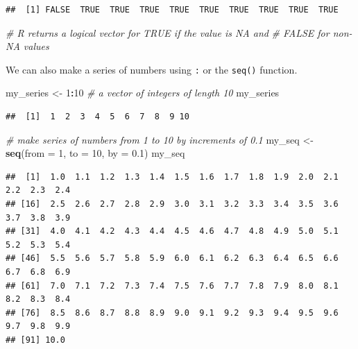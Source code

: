 \documentclass[
]{book}
\newenvironment{Shaded}{\begin{snugshade}}{\end{snugshade}}
\newcommand{\AttributeTok}[1]{\textcolor[rgb]{0.13,0.29,0.53}{#1}}
\newcommand{\CommentTok}[1]{\textcolor[rgb]{0.56,0.35,0.01}{\textit{#1}}}
\newcommand{\DecValTok}[1]{\textcolor[rgb]{0.00,0.00,0.81}{#1}}
\newcommand{\FloatTok}[1]{\textcolor[rgb]{0.00,0.00,0.81}{#1}}
\newcommand{\FunctionTok}[1]{\textcolor[rgb]{0.13,0.29,0.53}{\textbf{#1}}}
\newcommand{\NormalTok}[1]{#1}
\newcommand{\OtherTok}[1]{\textcolor[rgb]{0.56,0.35,0.01}{#1}}
\newcommand{\SpecialCharTok}[1]{\textcolor[rgb]{0.81,0.36,0.00}{\textbf{#1}}}
\begin{document}
\begin{verbatim}
##  [1] FALSE  TRUE  TRUE  TRUE  TRUE  TRUE  TRUE  TRUE  TRUE  TRUE
\end{verbatim}

\begin{Shaded}
\begin{Highlighting}[]
\CommentTok{\# R returns a logical vector for TRUE if the value is NA and }
\CommentTok{\# FALSE for non{-}NA values}
\end{Highlighting}
\end{Shaded}

We can also make a series of numbers using \texttt{:} or the \texttt{seq()} function.

\begin{Shaded}
\begin{Highlighting}[]
\NormalTok{my\_series }\OtherTok{\textless{}{-}} \DecValTok{1}\SpecialCharTok{:}\DecValTok{10} \CommentTok{\# a vector of integers of length 10}
\NormalTok{my\_series}
\end{Highlighting}
\end{Shaded}

\begin{verbatim}
##  [1]  1  2  3  4  5  6  7  8  9 10
\end{verbatim}

\begin{Shaded}
\begin{Highlighting}[]
\CommentTok{\# make series of numbers from 1 to 10 by increments of 0.1}
\NormalTok{my\_seq }\OtherTok{\textless{}{-}} \FunctionTok{seq}\NormalTok{(}\AttributeTok{from =} \DecValTok{1}\NormalTok{, }\AttributeTok{to =} \DecValTok{10}\NormalTok{, }\AttributeTok{by =} \FloatTok{0.1}\NormalTok{) }
\NormalTok{my\_seq}
\end{Highlighting}
\end{Shaded}

\begin{verbatim}
##  [1]  1.0  1.1  1.2  1.3  1.4  1.5  1.6  1.7  1.8  1.9  2.0  2.1  2.2  2.3  2.4
## [16]  2.5  2.6  2.7  2.8  2.9  3.0  3.1  3.2  3.3  3.4  3.5  3.6  3.7  3.8  3.9
## [31]  4.0  4.1  4.2  4.3  4.4  4.5  4.6  4.7  4.8  4.9  5.0  5.1  5.2  5.3  5.4
## [46]  5.5  5.6  5.7  5.8  5.9  6.0  6.1  6.2  6.3  6.4  6.5  6.6  6.7  6.8  6.9
## [61]  7.0  7.1  7.2  7.3  7.4  7.5  7.6  7.7  7.8  7.9  8.0  8.1  8.2  8.3  8.4
## [76]  8.5  8.6  8.7  8.8  8.9  9.0  9.1  9.2  9.3  9.4  9.5  9.6  9.7  9.8  9.9
## [91] 10.0
\end{verbatim}
\end{document}
